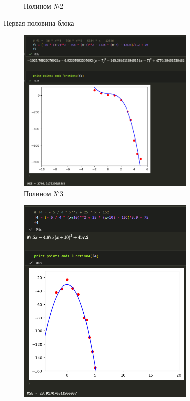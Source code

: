 \documentclass[14pt,a4paper]{extarticle}
\begin{document}
\begin{figure}[ht!]
\begin{subfigure}{.5\textwidth}
        \caption{Полином №2}
        \label{fig:3.4-2}
    \end{subfigure}%
    \caption{Первая половина блока}
    \label{fig:3.4block2-1}
\end{figure}
\newpage

\begin{figure}[ht!]
    \begin{subfigure}{.5\textwidth}
        \centering
        \includegraphics[width=0.95\textwidth]{figures/3.4 3.png}
        \caption{Полином №3}
        \label{fig:3.4-3}
    \end{subfigure}%
    \begin{subfigure}{.5\textwidth}
        \centering
        \includegraphics[width=0.95\textwidth]{figures/3.4 4.png}

\end{subfigure}
\end{figure}
\end{document}

